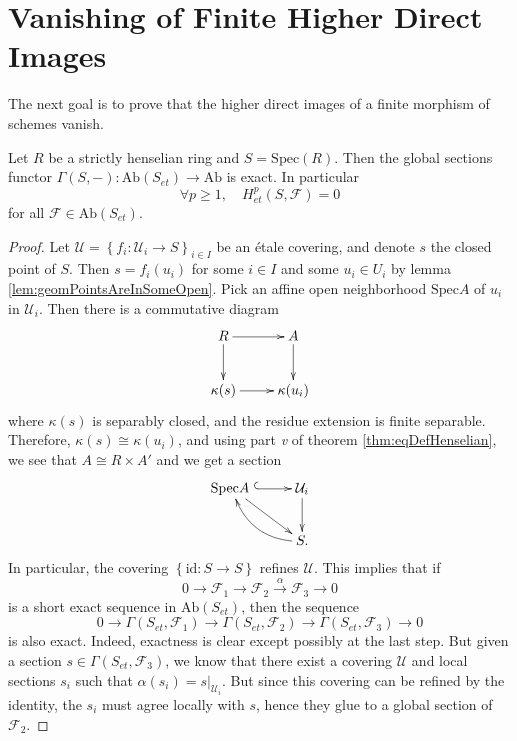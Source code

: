 \section{Vanishing of Finite Higher Direct Images}
\label{section-vanishing-finite-morphism}

\noindent
The next goal is to prove that the higher direct images of a finite morphism of 
schemes vanish.

\begin{lemma} \label{lem:vanishingOfCohomologyOverHenselianRings}
Let $R$ be a strictly henselian ring and $S=\text{Spec}(R)$. Then the global 
sections functor $\Gamma(S, -): \text{Ab}(S_{et})\to \text{Ab}$ is exact. In 
particular
$$
\forall p\geq 1, \quad H_{et}^p(S, \mathcal{F})=0
$$
for all $\mathcal{F}\in \text{Ab}(S_{et})$. 
\end{lemma}

\begin{proof}
Let $\mathcal{U} = \left\{f_i : \mathcal{U}_i \to S \right\}_{i\in I}$ be an 
\'etale covering, and denote $s$ the closed point of $S$. Then $s = f_i (u_i)$ 
for some $i\in I$ and some $u_i \in U_i$ by lemma 
\ref{lem:geomPointsAreInSomeOpen}. Pick an affine open neighborhood 
$\text{Spec} A$ of $u_i$ in $\mathcal{U}_i$. Then there is a commutative diagram
$$
\xymatrix{
R \ar[r] \ar[d] & A \ar[d] \\
{\kappa(s)} \ar[r] & {\kappa(u_i)}
}
$$
where $\kappa(s)$ is separably closed, and the residue extension is finite 
separable. Therefore, $\kappa(s) \cong \kappa(u_i)$, and using part {\it v} of 
theorem \ref{thm:eqDefHenselian}, we see that $A \cong R\times A'$ and we get a 
section
$$
\xymatrix{
{\text{Spec} A\ }\ar[dr] \ar@{^{(}->}[r] & {\mathcal{U}_i} \ar[d]\\
& {S.} \ar@/^1pc/[ul]
}
$$
In particular, the covering $\left\{\text{id} : S\to S\right\}$ refines 
$\mathcal{U}$. This implies that if 
$$
0 \to \mathcal{F}_1\to \mathcal{F}_2 \xrightarrow{\alpha} \mathcal{F}_3\to 0
$$
is a short exact sequence in $\text{Ab}(S_{et})$, then the sequence
$$
0 \to \Gamma(S_{et}, \mathcal{F}_1) \to \Gamma(S_{et}, \mathcal{F}_2) \to 
\Gamma(S_{et}, \mathcal{F}_3)\to 0
$$
is also exact. Indeed, exactness is clear except possibly at the last step. But 
given a section $s \in \Gamma(S_{et}, \mathcal{F}_3)$, we know that there exist 
a covering $\mathcal{U}$ and local sections $s_i$ such that $\alpha (s_i) = 
s|_{\mathcal{U}_i}$. But since this covering can be refined by the identity, 
the $s_i$ must agree locally with $s$, hence they glue to a global section of 
$\mathcal{F}_2$.
\end{proof}

